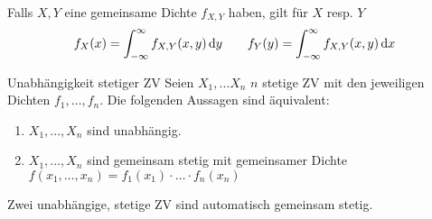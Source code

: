 \begin{tcolorbox}[lemmacore]
	Falls $X,Y$ eine gemeinsame Dichte $f_{X,Y}$ haben, gilt für $X$ resp. $Y$
	\begin{equation*}
		f_X (x) = \int_{-\infty}^{\infty} f_{X,Y}(x,y) \dif y
		\qquad
		f_Y (y) = \int_{-\infty}^{\infty} f_{X,Y}(x,y) \dif x
	\end{equation*}
\end{tcolorbox}
\begin{theorem}{Unabhängigkeit stetiger ZV}
	Seien $X_1, \ldots X_n$ $n$ stetige ZV mit den jeweiligen Dichten  $f_1 , \ldots , f_n$. Die folgenden Aussagen sind äquivalent:
	\begin{enumerate}
		\item $X_1 , \ldots , X_n$ sind unabhängig.
		\item $X_1 , \ldots , X_n$ sind gemeinsam stetig mit gemeinsamer Dichte\\ $f(x_1 , \ldots, x_n) = f_1 (x_1) \cdot
			\ldots \cdot f_n (x_n)$
	\end{enumerate}
\end{theorem}
Zwei unabhängige, stetige ZV sind automatisch gemeinsam stetig.
